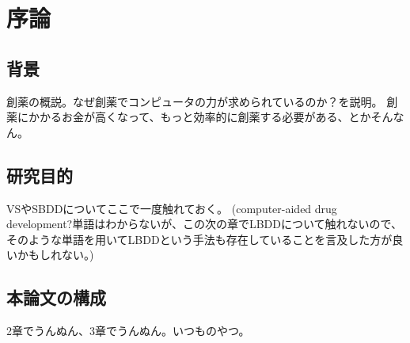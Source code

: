 \chapter{序論}
\section{背景}
創薬の概説。なぜ創薬でコンピュータの力が求められているのか？を説明。
創薬にかかるお金が高くなって、もっと効率的に創薬する必要がある、とかそんなん。

\section{研究目的}
VSやSBDDについてここで一度触れておく。
(computer-aided drug development?単語はわからないが、この次の章でLBDDについて触れないので、そのような単語を用いてLBDDという手法も存在していることを言及した方が良いかもしれない。)

\section{本論文の構成}
2章でうんぬん、3章でうんぬん。いつものやつ。